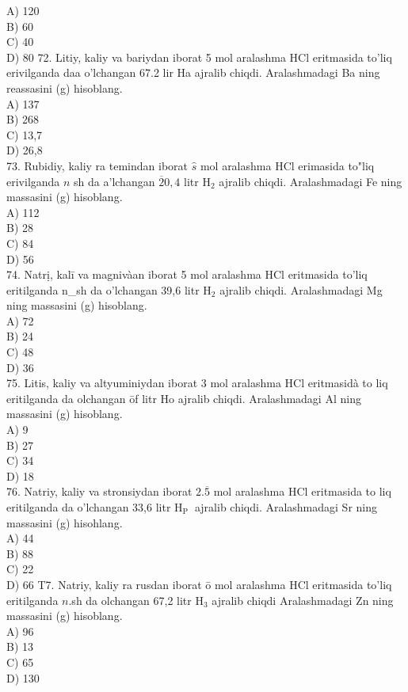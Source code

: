 A) 120\\
B) 60\\
C) 40\\
D) 80
72. Litiy, kaliy va bariydan iborat 5 mol aralashma HCl eritmasida to'liq erivilganda daa o'lchangan 67.2 lir Ha ajralib chiqdi. Aralashmadagi Ba ning reassasini (g) hisoblang.\\
A) 137\\
B) 268\\
C) 13,7\\
D) 26,8\\
73. Rubidiy, kaliy ra temindan iborat $\hat{s}$ mol aralashma HCl erimasida to"liq erivilganda $n$ sh da a'lchangan $\overline{2} 0,4$ litr $\mathrm{H}_{2}$ ajralib chiqdi. Aralashmadagi Fe ning massasini (g) hisoblang.\\
A) 112\\
B) 28\\
C) 84\\
D) 56\\
74. Natrị, kalī va magnivàan iborat 5 mol aralashma HCl eritmasida to'liq eritilganda n\_sh da o'lchangan 39,6 litr $\mathrm{H}_{2}$ ajralib chiqdi. Aralashmadagi Mg ning massasini (g) hisoblang.\\
A) 72\\
B) 24\\
C) 48\\
D) 36\\
75. Litis, kaliy va altyuminiydan iborat 3 mol aralashma HCl eritmasidà to liq eritilganda da olchangan ōf litr Ho ajralib chiqdi. Aralashmadagi Al ning massasini (g) hisoblang.\\
A) 9\\
B) 27\\
C) 34\\
D) 18\\
76. Natriy, kaliy va stronsiydan iborat $2 . \overline{5}$ mol aralashma HCl eritmasida to liq eritilganda da o'lchangan 33,6 litr $\mathrm{H}_{\text {P }}$ ajralib chiqdi. Aralashmadagi Sr ning massasini (g) hisohlang.\\
A) 44\\
B) 88\\
C) 22\\
D) 66
T7. Natriy, kaliy ra rusdan iborat ō mol aralashma HCl eritmasida to'liq eritilganda $n$.sh da olchangan 67,2 litr $\mathrm{H}_{3}$ ajralib chiqdi Aralashmadagi Zn ning massasini (g) hisoblang.\\
A) 96\\
B) 13\\
C) 65\\
D) 130

